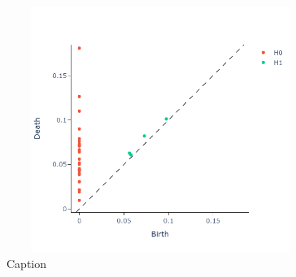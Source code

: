 \documentclass{article}
\begin{document}
\begin{figure}[h!]
    \centering
    \includegraphics[width= 10cm, height = 8cm]{PD btc.png}
    \caption{Caption}
    \label{fig:enter-label}
\end{figure}
\clearpage
\end{document}
